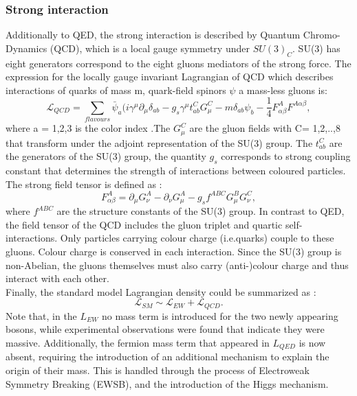\subsubsection{Strong interaction}
Additionally to QED, the strong interaction is described by Quantum Chromo-Dynamics (QCD), which is a local gauge symmetry under $SU(3)_C$. SU(3) has eight generators correspond to the eight gluons mediators of the strong force. The expression for the locally gauge invariant Lagrangian of QCD which describes interactions of quarks of mass m, quark-field spinors $\psi$ a mass-less gluons is:
\begin{equation}
    \mathcal{L}_{QCD} = \sum_{flavours} \bar{\psi}_a(i\gamma^\mu\partial_\mu\delta_{ab}-g_{s}\gamma^\mu t^C_{ab}G^C_\mu - m\delta_{ab}\psi_b - \frac{1}{4}F^A_{\alpha\beta}F^{A\alpha\beta},
\end{equation}
where a = 1,2,3 is the color index .The $G^{C}_\mu$ are the gluon fields with C= 1,2,..,8 that transform under the adjoint representation of the SU(3) group.  The $t^C_{ab}$ are the generators of the SU(3) group, the quantity $g_{s}$ corresponds to strong coupling constant that determines the strength of interactions between coloured particles. The strong field tensor is defined as :
\begin{equation}
    F^A_{\alpha\beta} = \partial_\mu G^A_\nu - \partial_\nu G^A_\mu - g_sf^{ABC}G^B_\mu G^C_\nu,
 \end{equation}
where $f^{ABC}$ are the structure constants of the SU(3) group. In contrast to QED, the field tensor of the QCD includes the gluon triplet and quartic self-interactions. Only particles carrying colour charge (i.e.quarks) couple to these gluons. Colour charge is conserved in each interaction. Since the SU(3) group is non-Abelian, the gluons themselves must also carry (anti-)colour charge and thus interact with each other. \\

Finally, the standard model Lagrangian density could be summarized as : 
\begin{equation}
    \mathcal{L}_{SM} \sim \mathcal{L}_{EW} + \mathcal{L}_{QCD}.
\end{equation}
Note that, in the $L_{EW}$  no mass term is introduced for the two newly appearing bosons, while experimental observations were found that indicate they were massive. Additionally, the fermion mass term that appeared in $L_{QED}$ is now absent, requiring the introduction of an additional mechanism to explain the origin of their mass. This is handled through the process of Electroweak Symmetry Breaking (EWSB), and the introduction of the Higgs mechanism.
